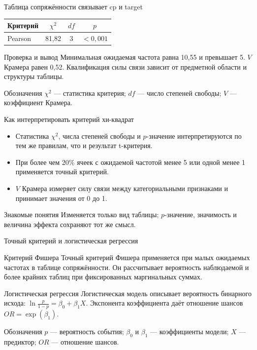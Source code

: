 \documentclass[aspectratio=169]{beamer}
\begin{document}
\begin{frame}{Таблица сопряжённости связывает cp и target}
  \centering
  \begin{tabular}{lccc}
    \textbf{Критерий} & $\chi^2$ & $df$ & $p$ \\ \hline
    Pearson & 81,82 & 3 & $<0{,}001$
  \end{tabular}
  \par\vspace{0.3cm}
  \begin{block}{Проверка и вывод}
    Минимальная ожидаемая частота равна 10,55 и превышает 5. $V$ Крамера равен 0,52. Квалификация силы связи зависит от предметной области и структуры таблицы.
  \end{block}
  \begin{block}{Обозначения}\tiny
    $\chi^2$ — статистика критерия; $df$ — число степеней свободы; $V$ — коэффициент Крамера.
  \end{block}
\end{frame}

\begin{frame}{Как интерпретировать критерий хи-квадрат}
  \begin{itemize}
    \item Статистика $\chi^2$, числа степеней свободы и $p$-значение интерпретируются по тем же правилам, что и результат t-критерия.
    \item При более чем 20\% ячеек с ожидаемой частотой менее 5 или одной менее 1 применяется точный критерий.
    \item $V$ Крамера измеряет силу связи между категориальными признаками и принимает значения от 0 до 1.
  \end{itemize}
  \begin{block}{Знакомые понятия}
    Изменяется только вид таблицы; $p$-значение, значимость и величина эффекта сохраняют тот же смысл.
  \end{block}
\end{frame}

\begin{frame}{Точный критерий и логистическая регрессия}
  \begin{block}{Критерий Фишера}\footnotesize
    Точный критерий Фишера применяется при малых ожидаемых частотах в таблице сопряжённости. Он рассчитывает вероятность наблюдаемой и более крайних таблиц при фиксированных маргинальных суммах.
  \end{block}
  \begin{block}{Логистическая регрессия}\footnotesize
    Логистическая модель описывает вероятность бинарного исхода: $\ln\frac{p}{1-p}=\beta_0+\beta_1X$. Экспонента коэффициента даёт отношение шансов $OR=\exp(\beta_1)$.
  \end{block}
  \begin{block}{Обозначения}\tiny
    $p$ — вероятность события; $\beta_0$ и $\beta_1$ — коэффициенты модели; $X$ — предиктор; $OR$ — отношение шансов.
  \end{block}
\end{frame}
\end{document}
